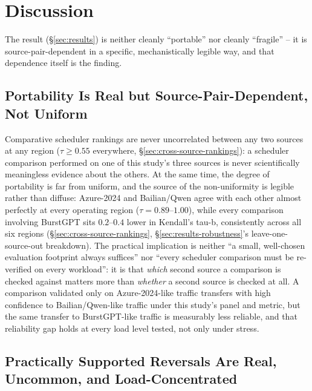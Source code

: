 \section{Discussion}
\label{sec:discussion}

The result (\S\ref{sec:results}) is neither cleanly ``portable'' nor
cleanly ``fragile'' -- it is source-pair-dependent in a specific,
mechanistically legible way, and that dependence itself is the finding.

\subsection{Portability Is Real but Source-Pair-Dependent, Not Uniform}

Comparative scheduler rankings are never uncorrelated between any two
sources at any region ($\tau \geq 0.55$ everywhere,
\S\ref{sec:cross-source-rankings}): a scheduler comparison performed on
one of this study's three sources is never scientifically meaningless
evidence about the others. At the same time, the degree of portability is
far from uniform, and the source of the non-uniformity is legible rather
than diffuse: Azure-2024 and Bailian/Qwen agree with each other almost
perfectly at every operating region ($\tau = 0.89$--$1.00$), while every
comparison involving BurstGPT sits $0.2$--$0.4$ lower in Kendall's tau-b,
consistently across all six regions (\S\ref{sec:cross-source-rankings},
\S\ref{sec:results-robustness}'s leave-one-source-out breakdown). The
practical implication is neither ``a small, well-chosen evaluation
footprint always suffices'' nor ``every scheduler comparison must be
re-verified on every workload'': it is that \emph{which} second source a
comparison is checked against matters more than \emph{whether} a second
source is checked at all. A comparison validated only on Azure-2024-like
traffic transfers with high confidence to Bailian/Qwen-like traffic under
this study's panel and metric, but the same transfer to BurstGPT-like
traffic is measurably less reliable, and that reliability gap holds at
every load level tested, not only under stress.

\subsection{Practically Supported Reversals Are Real, Uncommon, and
Load-Concentrated}

